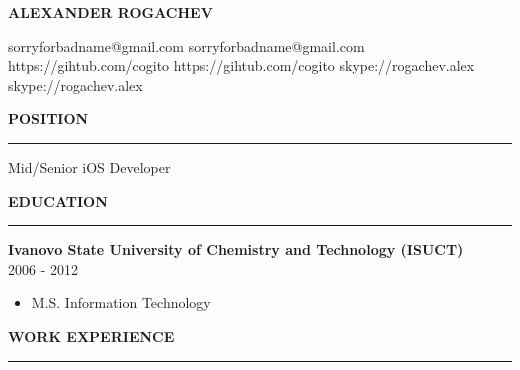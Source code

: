 \documentclass{article}
\newcommand*{\applicant}[1]{\gdef\applicanttext{#1}}
\newcommand*{\github}[1]{\gdef\githubtext{#1}}
\newcommand*{\email}[1]{\gdef\emailtext{#1}}
\newcommand*{\skype}[1]{\gdef\skypetext{#1}}
\renewcommand\maketitle{
  {\setstretch{1.5}
    \centerline{
       \textbf{\huge{\uppercase{\applicanttext}}}
    }
    \centerline{
      \ifdefined\emailtext
        \faEnvelopeO \hspace{0.1cm} \emailtext \hspace{0.1cm} 
      \fi
      \ifdefined\githubtext
        \faGithub \hspace{0.1cm} \githubtext \hspace{0.1cm} 
      \fi
      \ifdefined\skypetext
        \faSkype \hspace{0.1cm} \skypetext
      \fi
      \ifdefined\linkedintext
        \faLinkedin \hspace{0.1cm} \linkedintext
      \fi
    }
    \vspace{0.2cm}
  }
}
\newcommand{\cvsection}[1]{
  \vspace{2.6ex}
  \noindent\textbf{\large{\uppercase{#1}}}
  \vspace{1ex}
  \hrule
  \vspace{1.5ex}
}
\newcommand{\cvparagraph}[3]{
  \noindent\indent
  \textbf{#1}
  \ 
  \textit{#2}
  \ 
  \hfill{}
  {#3}\vspace{1ex}
}
\begin{document}
\pagestyle{fancy}
\fancyhf{}
\renewcommand{\headrulewidth}{0pt}

\applicant{Alexander Rogachev}
\github{https://gihtub.com/cogito}
\email{sorryforbadname@gmail.com}
\skype{skype://rogachev.alex}

\maketitle

\cvsection{Position}
Mid/Senior iOS Developer

\cvsection{Education}
\cvparagraph{Ivanovo State University of Chemistry and Technology (ISUCT)}{}{2006 - 2012}
\begin{itemize}[topsep=0ex,leftmargin=*]
  \item M.S. Information Technology
\end{itemize}

\cvsection{Work Experience}
\end{document}
